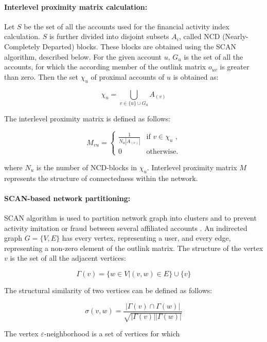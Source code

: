 \documentclass[a4paper,12pt]{article}
\begin{document}
\paragraph{Interlevel proximity matrix calculation:}
Let $S$ be the set of all the accounts used for the financial activity index calculation. $S$ is further divided into disjoint subsets $A_i$, called NCD (Nearly-Completely Departed) blocks. These blocks are obtained using the SCAN algorithm, described below. For the given account $u$, $G_u$ is the set of all the accounts, for which the according member of the outlink matrix $o_{uv}$ is greater than zero. Then the set $\chi_u$ of proximal accounts of $u$ is obtained as: 



$$
\chi_u = \bigcup_{v \in \{u\} \cup G_u} A_{(v)}
$$

The interlevel proximity matrix is defined as follows:



$$
M_{vu}=\begin{cases}
 \frac{1}{N_u |A_{(v)}|}
 & \text{if $v \in \chi_u$ ,}\\
 0 & \text{otherwise.}
\end{cases}
$$

where $N_u$ is the number of NCD-blocks in $\chi_u$. Interlevel proximity matrix $M$ represents the structure of connectedness within the network.



\paragraph{SCAN-based network partitioning:}
SCAN algorithm is used to partition network graph into clusters and to prevent activity imitation or fraud between several affiliated accounts \cite{SCAN}. An indirected graph $G = \{V, E\}$ has every vertex, representing a user, and every edge, representing a non-zero element of the outlink matrix. The structure of the vertex $v$ is the set of all the adjacent vertices:


$$
\Gamma(v)=\{w \in V|(v,w) \in E\} \cup \{v\}
$$

The structural similarity of two vertices can be defined as follows:



$$
\sigma(v,w)=\frac{ |\Gamma(v) \cap \Gamma(w)|}{\sqrt{|\Gamma(v)||\Gamma(w)|}}
$$

The vertex $\varepsilon$-neighborhood is a set of vertices for which
\end{document}
